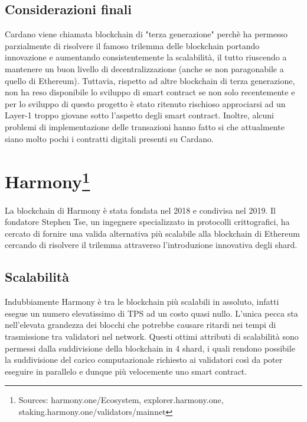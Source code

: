 \documentclass[a4paper, 12pt]{article}
\begin{document}
\subsection*{Considerazioni finali}
Cardano viene chiamata blockchain di "terza generazione" perchè ha permesso parzialmente di risolvere il famoso trilemma delle blockchain portando innovazione e aumentando consistentemente la scalabilità, il tutto riuscendo a mantenere un buon livello di decentralizzazione (anche se non paragonabile a quello di Ethereum). Tuttavia, rispetto ad altre blockchain di terza generazione, non ha reso disponibile lo sviluppo di smart contract se non solo recentemente e per lo sviluppo di questo progetto è stato ritenuto rischioso approciarsi ad un Layer-1 troppo giovane sotto l'aspetto degli smart contract.
Inoltre, alcuni problemi di implementazione delle transazioni hanno fatto si che attualmente siano molto pochi i contratti digitali presenti su Cardano.


\newpage
\section*{Harmony\footnote{Sources: harmony.one/Ecosystem, explorer.harmony.one, staking.harmony.one/validators/mainnet}}
La blockchain di Harmony è stata fondata nel 2018 e condivisa nel 2019. Il fondatore Stephen Tse, un ingegnere specializzato in protocolli crittografici, ha cercato di fornire una valida alternativa più scalabile alla blockchain di Ethereum cercando di risolvere il trilemma attraverso l'introduzione innovativa degli shard.
\subsection*{Scalabilità}
Indubbiamente Harmony è tra le blockchain più scalabili in assoluto, infatti esegue un numero elevatissimo di TPS ad un costo quasi nullo. L'unica pecca sta nell'elevata grandezza dei blocchi che potrebbe causare ritardi nei tempi di trasmissione tra validatori nel network. Questi ottimi attributi di scalabilità sono permessi dalla suddivisione della blockchain in 4 shard, i quali rendono possibile la suddivisione del carico computazionale richiesto ai validatori così da poter eseguire in parallelo e dunque più velocemente uno smart contract.
\end{document}
